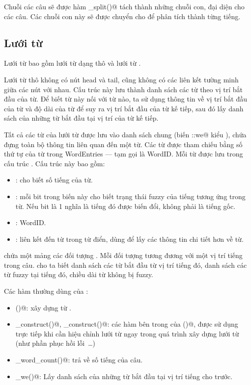 \documentclass[a4paper,oneside,14pt]{extbook} %
\begin{document}
Chuỗi các câu sẽ được hàm \verb@sentences_split()@ tách thành những
chuỗi con, đại diện cho các câu. Các chuỗi con này sẽ được chuyển cho
\verb@Sentence@ để phân tích thành từng tiếng.

\subsection{Lưới từ}

Lưới từ bao gồm lưới từ dạng thô \verb@Lattice@ và lưới từ \verb@DAG@.

Lưới từ thô \verb@Lattice@ không có nút head và tail, cũng không có các
liên kết tường minh giữa các nút với nhau. Cấu trúc này lưu thành danh
sách các từ theo vị trí bắt đầu của từ. Để biết từ này nối với từ nào,
ta sử dụng thông tin về vị trí bắt đầu của từ và độ dài của từ để suy
ra vị trí bắt đầu của từ kế tiếp, sau đó lấy danh sách của những từ
bắt đầu tại vị trí của từ kế tiếp.

Tất cả các từ của lưới từ được lưu vào danh sách chung (biến
\verb@Lattice::we@ kiểu \verb@WordEntries@), chứa đựng toàn bộ thông tin
liên quan đến một từ. Các từ được tham chiếu bằng số thứ tự của từ
trong WordEntries --- tạm gọi là WordID. Mỗi từ được lưu trong cấu
trúc \verb@WordEntry@. Cấu trúc này bao gồm:
\begin{itemize}
\item \verb@len@: cho biết số tiếng của từ.
\item \verb@fuzid@: mỗi bit trong biến này cho biết trạng thái fuzzy
  của tiếng tương ứng trong từ. Nếu bit là 1 nghĩa là tiếng đó được
  biến đổi, không phải là tiếng gốc.
\item \verb@id@: WordID.
\item \verb@node@: liên kết đến từ trong từ điển, dùng để lấy các
  thông tin chi tiết hơn về từ.
\end{itemize}

\verb@Lattice@ chứa một mảng các đối tượng \verb@WordInfos@. Mỗi đối
tượng \verb@WordInfo@ tương đương với một vị trí tiếng trong
câu. \verb@WordInfos@ cho ta biết danh sách các từ bắt đầu từ vị trí
tiếng đó, danh sách các từ fuzzy tại tiếng đó, chiều dài từ không bị
fuzzy. 

Các hàm thường dùng của \verb@Lattice@:
\begin{itemize}
\item \verb@construct()@: xây dựng \verb@Lattice@ từ \verb@Sentence@.
\item \verb@pre_construct()@, \verb@post_construct()@: các hàm bên
  trong của \verb@construct()@, được sử dụng trực tiếp khi cần hiệu
  chỉnh lưới từ ngay trong quá trình xây dựng lưới từ (như phần phục
  hồi lỗi~\ldots)
\item \verb@get_word_count()@: trả về số tiếng của câu.
\item \verb@get_we()@: Lấy danh sách \verb@WordEntry@ của những từ bắt
  đầu tại vị trí tiếng cho trước.
\end{itemize}
\end{document}
